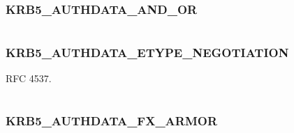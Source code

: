 \documentclass[letterpaper,10pt,english]{sphinxmanual}
\begin{document}
\subsubsection{KRB5\_AUTHDATA\_AND\_OR}
\label{appdev/refs/macros/KRB5_AUTHDATA_AND_OR::doc}\label{appdev/refs/macros/KRB5_AUTHDATA_AND_OR:krb5-authdata-and-or-data}\label{appdev/refs/macros/KRB5_AUTHDATA_AND_OR:krb5-authdata-and-or}

\begin{fulllineitems}
\label{appdev/refs/macros/KRB5_AUTHDATA_AND_OR:KRB5_AUTHDATA_AND_OR}
\end{fulllineitems}


\begin{tabulary}{\linewidth}{|L|L|}
\hline

 & 
\\\hline
\end{tabulary}



\subsubsection{KRB5\_AUTHDATA\_ETYPE\_NEGOTIATION}
\label{appdev/refs/macros/KRB5_AUTHDATA_ETYPE_NEGOTIATION:krb5-authdata-etype-negotiation}\label{appdev/refs/macros/KRB5_AUTHDATA_ETYPE_NEGOTIATION::doc}\label{appdev/refs/macros/KRB5_AUTHDATA_ETYPE_NEGOTIATION:krb5-authdata-etype-negotiation-data}

\begin{fulllineitems}
\label{appdev/refs/macros/KRB5_AUTHDATA_ETYPE_NEGOTIATION:KRB5_AUTHDATA_ETYPE_NEGOTIATION}
\end{fulllineitems}


RFC 4537.

\begin{tabulary}{\linewidth}{|L|L|}
\hline

 & 
\\\hline
\end{tabulary}



\subsubsection{KRB5\_AUTHDATA\_FX\_ARMOR}
\label{appdev/refs/macros/KRB5_AUTHDATA_FX_ARMOR::doc}\label{appdev/refs/macros/KRB5_AUTHDATA_FX_ARMOR:krb5-authdata-fx-armor}\label{appdev/refs/macros/KRB5_AUTHDATA_FX_ARMOR:krb5-authdata-fx-armor-data}
\end{document}
